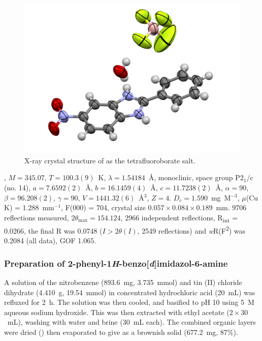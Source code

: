 \begin{refsection}
\begin{figure}[ht]
    \centering
    \includegraphics[width=0.8\linewidth]{Figures/rhs-nitro-xray.pdf}
    \caption{X-ray crystal structure of  as the tetrafluoroborate salt.}\label{fig:rhs-nitro-xray}
\end{figure}

, $M=345.07$, $T=100.3(9)$~K, $\lambda=1.54184$~\AA, monoclinic, space group $\text{P}2_1/\text{c}$ (no. 14), $a = 7.6592(2)$~\AA, $b = 16.1459(4)$~\AA, $c = 11.7238(2)$~\AA, $\alpha = 90$\degree, $\beta = 96.208(2)$\degree, $\gamma = 90$\degree, $V = 1441.32(6)$~\AA$^{3}$, $Z = 4$. $D_{c}= 1.590$~mg~M$^{-3}$, $\mu$(Cu K\a) = 1.288~mm$^{-1}$, F(000) = 704, crystal size $0.057 \times 0.084 \times 0.189$~mm. 9706 reflections measured, $2\theta_{\max}=154.124$\degree, 2966 independent reflections, R\textsubscript{int} = 0.0266, the final R was 0.0748 ($I > 2\theta(I)$, 2549 reflections) and \emph{w}R(F\textsuperscript{2}) was 0.2084 (all data), GOF 1.065. 

\subsubsection[Preparation of \refcmpd{rhs-amine}]{Preparation of 2-phenyl-1\emph{H}-benzo[\emph{d}]imidazol-6-amine }
A solution of the nitrobenzene  (893.6~mg, 3.735~mmol) and tin (II) chloride dihydrate (4.410~g, 19.54~mmol) in concentrated hydrochloric acid (20~mL) was refluxed for 2~h.
The solution was then cooled, and basified to pH 10 using 5~M aqueous sodium hydroxide.
This was then extracted with ethyl acetate ($2\times30$~mL), washing with water and brine (30~mL each).
The combined organic layers were dried () then evaporated to give  as a brownish solid (677.2~mg, 87\%).\autocite{Patrick2017}


\end{refsection}
